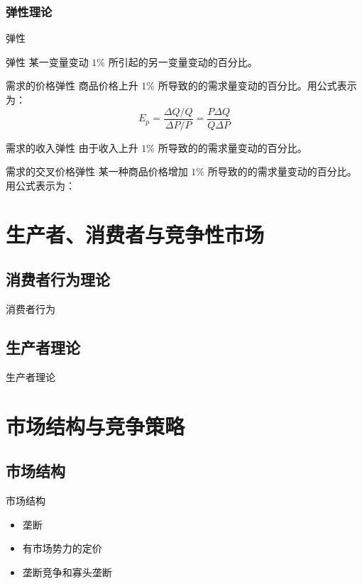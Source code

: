 \documentclass[UTF8]{ctexbeamer}
\begin{document}
\subsubsection{弹性理论}
\begin{frame}{弹性}
\begin{block}{弹性}
某一变量变动 $ 1\% $ 所引起的另一变量变动的百分比。
\end{block}
\begin{block}{需求的价格弹性}
商品价格上升 $ 1\% $ 所导致的的需求量变动的百分比。用公式表示为：
\begin{equation*}
E_p = \frac{\Delta Q / Q}{\Delta P / P} = \frac{P\Delta Q}{Q\Delta P}
\end{equation*}
\end{block}
\begin{block}{需求的收入弹性}
由于收入上升 $ 1\% $ 所导致的的需求量变动的百分比。
\end{block}
\begin{block}{需求的交叉价格弹性}
某一种商品价格增加 $ 1\% $ 所导致的的需求量变动的百分比。用公式表示为：
\end{block}
\end{frame}


\section{生产者、消费者与竞争性市场}

\subsection{消费者行为理论}
\begin{frame}{消费者行为}
\end{frame}


\subsection{生产者理论}
\begin{frame}{生产者理论}
\end{frame}

\section{市场结构与竞争策略}

\subsection{市场结构}
\begin{frame}{市场结构}
\begin{itemize}
\item 垄断
\item 有市场势力的定价
\item 垄断竞争和寡头垄断
\end{itemize}
\end{frame}
\end{document}
